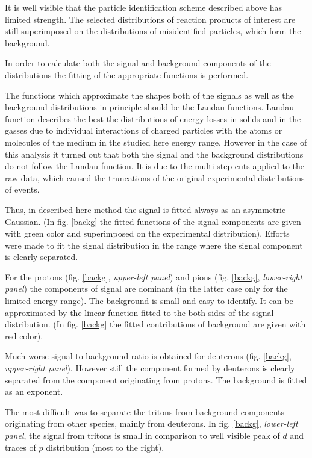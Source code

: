 It is well visible that the particle identification scheme described above has limited strength. 
The selected distributions of reaction products of interest  
are still superimposed on the distributions of misidentified particles, which form the background. 

In order to calculate both the signal and background components 
of the distributions the fitting of the appropriate functions is performed. 

The functions which approximate the shapes both of the signals as well as 
the background distributions in principle should be the Landau functions. 
Landau function describes the best the distributions of energy losses 
in solids and in the gasses due to individual interactions of charged particles 
with the atoms or molecules of the medium in the studied here energy range. 
However in the case of this analysis it turned out that both the signal and the  background 
distributions do not follow the Landau function. 
It is due to the multi-step cuts applied to the raw data, which caused 
the truncations of the original experimental distributions of events.  

Thus, in described here method the signal is fitted always as an asymmetric Gaussian. 
(In fig. \ref{backg} the fitted functions 
of the signal components are given with green color and superimposed on the experimental distribution). 
Efforts were made to fit the signal distribution in the range where the signal component is clearly separated.

For the protons (fig. \ref{backg}, {\it upper-left panel}) and pions (fig. \ref{backg}, {\it lower-right panel}) 
the components of signal are dominant 
(in the latter case only for the limited energy range).  
 The background is small and easy to identify. It can be approximated by the linear function fitted 
to the both sides of the signal  distribution. 
(In fig. \ref{backg} the fitted contributions of background are given with red color).

Much worse signal to background ratio is obtained for deuterons (fig. \ref{backg}, {\it upper-right panel}). 
However still the component formed by deuterons is clearly 
separated from the component originating from protons. The background is fitted as an exponent.

The most difficult was to separate the tritons from background components originating 
from other species, mainly from deuterons. In fig. \ref{backg}, {\it lower-left panel}, the signal from tritons is small 
in comparison to well visible peak of $d$ and traces of $p$ distribution (most to the right).

